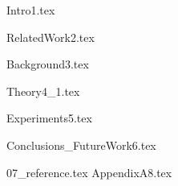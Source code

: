 \documentclass{ctuthesis}
\begin{document}
\maketitle


{Intro1.tex}

{RelatedWork2.tex}

{Background3.tex}


{Theory4_1.tex}




{Experiments5.tex}


{Conclusions_FutureWork6.tex}



{07_reference.tex}
{AppendixA8.tex}
\end{document}
